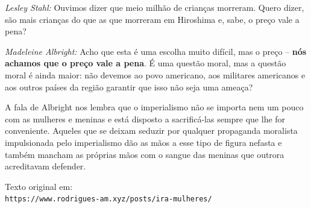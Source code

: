 \documentclass[12pt,twocolumn]{article}
\begin{document}
\emph{Lesley Stahl:} Ouvimos dizer que meio milhão de crianças morreram. Quero dizer, são mais crianças do que as que morreram em Hiroshima e, sabe, o preço vale a pena?

\emph{Madeleine Albright:} Acho que esta é uma escolha muito difícil, mas o preço -- \textbf{nós achamos que o preço vale a pena}. É uma questão moral, mas a questão moral é ainda maior: não devemos ao povo americano, aos militares americanos e aos outros países da região garantir que isso não seja uma ameaça?

A fala de Albright nos lembra que o imperialismo não se importa nem um pouco com as mulheres e meninas e está disposto a sacrificá-las sempre que lhe for conveniente. Aqueles que se deixam seduzir por qualquer propaganda moralista impulsionada pelo imperialismo dão as mãos a esse tipo de figura nefasta e também mancham as próprias mãos com o sangue das meninas que outrora acreditavam defender.
\hspace{1.2em}

\vspace{20em}
Texto original em:\\
\scriptsize
\texttt{https://www.rodrigues-am.xyz/posts/ira-mulheres/}
\end{document}
